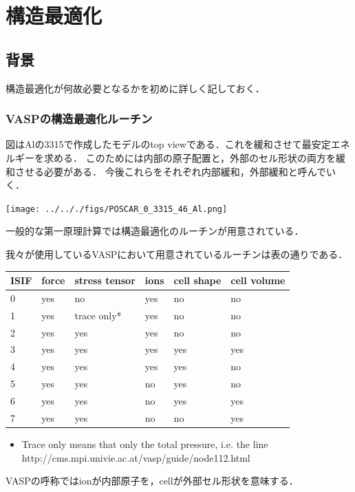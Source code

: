 \chapter{構造最適化}\label{ux69cbux9020ux6700ux9069ux5316}

    \section{背景}\label{ux80ccux666f}

構造最適化が何故必要となるかを初めに詳しく記しておく．

    \subsection{VASPの構造最適化ルーチン}\label{vaspux306eux69cbux9020ux6700ux9069ux5316ux30ebux30fcux30c1ux30f3}

図はAlの3315で作成したモデルのtop
viewである．これを緩和させて最安定エネルギーを求める．
このためには内部の原子配置と，外部のセル形状の両方を緩和させる必要がある．
今後これらをそれぞれ内部緩和，外部緩和と呼んでいく．

\begin{center}
\texttt{[image: ../.././figs/POSCAR\_0\_3315\_46\_Al.png]}
\end{center}
一般的な第一原理計算では構造最適化のルーチンが用意されている．

\label{fig:This}
我々が使用しているVASPにおいて用意されているルーチンは表の通りである．

\begin{longtable}[]{@{}llllll@{}}
\toprule
ISIF & force & stress tensor & ions & cell shape & cell
volume\tabularnewline
\midrule
\endhead
0 & yes & no & yes & no & no\tabularnewline
1 & yes & trace only* & yes & no & no\tabularnewline
2 & yes & yes & yes & no & no\tabularnewline
3 & yes & yes & yes & yes & yes\tabularnewline
4 & yes & yes & yes & yes & no\tabularnewline
5 & yes & yes & no & yes & no\tabularnewline
6 & yes & yes & no & yes & yes\tabularnewline
7 & yes & yes & no & no & yes\tabularnewline
\bottomrule
\end{longtable}

\begin{itemize}
\tightlist
\item
  Trace only means that only the total pressure, i.e. the line
  http://cms.mpi.univie.ac.at/vasp/guide/node112.html
\end{itemize}

VASPの呼称ではionが内部原子を，cellが外部セル形状を意味する．

